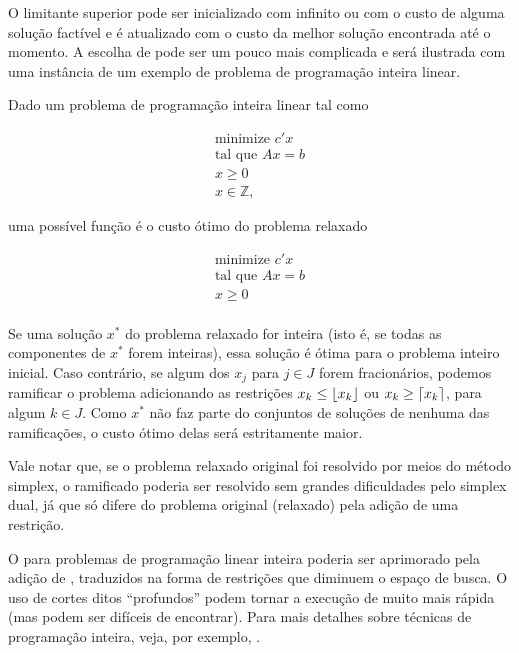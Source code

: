\documentclass{article}
\begin{document}
O limitante superior  pode ser inicializado com infinito ou com o custo de alguma
solução factível e é atualizado com o custo da melhor solução encontrada até o momento. A escolha de
 pode ser um pouco mais complicada e será ilustrada com uma instância de um exemplo de
problema de programação inteira linear.

Dado um problema de programação inteira linear tal como

\begin{align}
  \text{minimize } c'x \\
  \text{tal que }  Ax = b\\
           x \geq 0\\
           x \in \mathbb{Z},
\end{align}\label{eq:inteiro}

\noindent uma possível função  é o custo ótimo do problema relaxado

\begin{align}
  \text{minimize } c'x \\
  \text{tal que }  Ax = b\\
           x \geq 0\\
\end{align}\label{eq:inteiro}

Se uma solução $x^*$ do problema relaxado for inteira (isto é, se todas as componentes de $x^*$ forem
inteiras), essa solução é ótima para o problema inteiro inicial. Caso contrário, se algum dos $x_j$ para $j
\in J$ forem fracionários, podemos ramificar o problema adicionando as restrições $x_k \leq
\floor*{x_k}$ ou $x_k \geq \ceil*{x_k}$, para algum $k \in J$. Como $x^*$ não faz parte do
conjuntos de soluções de nenhuma das ramificações, o custo ótimo delas será estritamente maior.

Vale notar que, se o problema relaxado original foi resolvido por meios do método simplex, o
ramificado poderia ser resolvido sem grandes dificuldades pelo simplex dual, já que só difere do
problema original (relaxado) pela adição de uma restrição.

O  para problemas de programação linear inteira poderia ser aprimorado
pela adição de , traduzidos na forma de restrições que diminuem o espaço
de busca. O uso de cortes ditos ``profundos'' podem tornar a execução de  muito mais rápida (mas podem ser difíceis de encontrar). Para mais detalhes sobre técnicas
de programação inteira, veja, por exemplo, \cite{tsitsiklis}.
\end{document}
